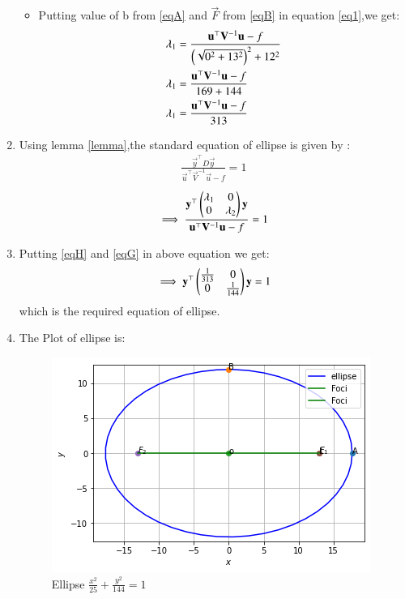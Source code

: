 \documentclass[journal,12pt,twocolumn]{IEEEtran}
\begin{document}
\begin{enumerate}
\begin{itemize}
\item Putting value of b from \eqref{eqA} and $\vec{F}$ from \eqref{eqB} in equation \eqref{eq1},we get:
\begin{align}
   \lambda_1&= \frac{\mathbf{u}^{\top}\mathbf{V}^{-1}\mathbf{u}-f}{\left(\sqrt{0^2+13^2}\right)^2+12^2}\\
     \lambda_1&= \frac{\mathbf{u}^{\top}\mathbf{V}^{-1}\mathbf{u}-f}{169+144}\\
      \lambda_1&= \frac{\mathbf{u}^{\top}\mathbf{V}^{-1}\mathbf{u}-f}{313}\label{eqG}
\end{align}
\end{itemize}
\item Using lemma \eqref{lemma},the standard equation of ellipse is given by :
\begin{align}
\frac{\vec{y}^{\top}D\vec{y}}{\vec{u}^{\top}\vec{V}^{-1}\vec{u}-f}=1
\end{align}
\begin{align}
\implies \frac{\mathbf{y}^{\top}\begin{pmatrix}\lambda_1& 0 \\ 0 & \lambda_2\end{pmatrix}\mathbf{y} }{\mathbf{u}^{\top}\mathbf{V}^{-1}\mathbf{u}-f}=1
\end{align}
\item Putting \eqref{eqH} and \eqref{eqG} in above equation we get:
\begin{align}
\implies \mathbf{y}^{\top}\begin{pmatrix}\frac{1}{313}& 0 \\ 0 & \frac{1}{144}\end{pmatrix}\mathbf{y}=1
\end{align}
which is the required equation of ellipse.
\item The Plot of ellipse is:
\begin{figure}[!ht]
    \centering
    \includegraphics[width=\columnwidth]{figure6.png}
    \caption{Ellipse $\frac{x^2}{25} + \frac{y^2}{144} = 1$}
    \label{fig:ellipse}
\end{figure} 
\end{enumerate}
\end{document}
